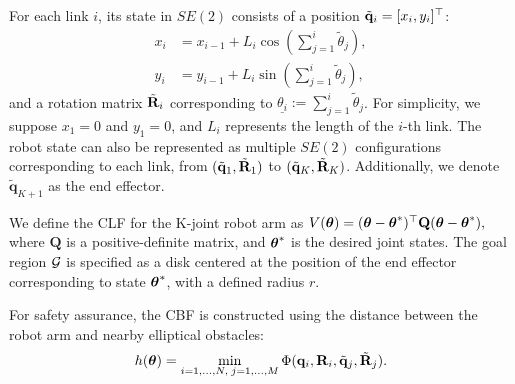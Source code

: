 For each link \(i\), its state in $SE(2)$ consists of a position $\tilde{\mathbf{q}}_i = [x_i,y_i]^\top$: 
\begin{align}
x_i &= x_{i-1} + L_i \cos\left(\sum_{j=1}^{i} \tilde{\theta}_j\right), \\
y_i &= y_{i-1} + L_i \sin\left(\sum_{j=1}^{i} \tilde{\theta}_j\right),
\end{align}
%
and a rotation matrix $\tilde{\mathbf{R}}_i$ corresponding to $\underline{\theta_i} := \sum_{j=1}^{i}\tilde{\theta}_j$. For simplicity, we suppose $ x_1 = 0 $ and $ y_1 = 0 $, and $ L_i $ represents the length of the $i$-th link. The robot state can also be represented as multiple $ SE(2) $ configurations corresponding to each link, from $ (\tilde{\mathbf{q}}_1, \tilde{\mathbf{R}}_1) $ to $ (\tilde{\mathbf{q}}_{K}, \tilde{\mathbf{R}}_{K}) $. Additionally, we denote $\tilde{\mathbf{q}}_{K+1}$ as the end effector.

We define the CLF for the K-joint robot arm as 
%
$
V(\boldsymbol{\theta}) = (\boldsymbol{\theta} - \boldsymbol{\theta}^*)^\top \mathbf{Q} (\boldsymbol{\theta} - \boldsymbol{\theta}^*),
$
%
where \( \mathbf{Q} \) is a positive-definite matrix, and \( \boldsymbol{\theta}^*\) is the desired joint states. The goal region ${\cal G}$ is specified as a disk centered at the position of the end effector corresponding to state $\boldsymbol{\theta}^*$, with a defined radius $r$.

For safety assurance, the CBF is constructed using the distance between the robot arm and nearby elliptical obstacles:
%
\begin{equation}
h(\boldsymbol{\theta}) = \min_{i = 1, \ldots, N, \; j = 1, \ldots, M} \Phi(\mathbf{q}_i, \mathbf{R}_i, \tilde{\mathbf{q}}_j, \tilde{\mathbf{R}}_j).
\end{equation}

%











